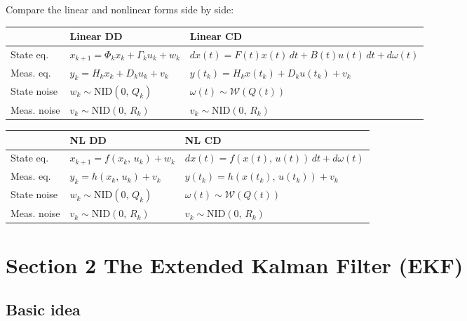 \documentclass[12pt, a4paper]{article}
\begin{document}
Compare the linear and nonlinear forms side by side:
\begin{center}
\renewcommand{\arraystretch}{1.5}
\begin{tabular}{p{2cm} p{5.8cm} p{5.8cm}}
  \toprule
  & \textbf{Linear DD} & \textbf{Linear CD} \\
  \midrule
  State eq. &
    $x_{k+1} = \Phi_k x_k + \Gamma_k u_k + w_k$ &
    $dx(t) = F(t)x(t)\,dt + B(t)u(t)\,dt + d\omega(t)$ \\
  Meas. eq. &
    $y_k = H_k x_k + D_k u_k + v_k$ &
    $y(t_k) = H_k x(t_k) + D_k u(t_k) + v_k$ \\
  State noise &
    $w_k \sim \mathrm{NID}(0,\,Q_k)$ &
    $\omega(t) \sim \mathcal{W}(Q(t))$ \\
  Meas. noise &
    $v_k \sim \mathrm{NID}(0,\,R_k)$ &
    $v_k \sim \mathrm{NID}(0,\,R_k)$ \\
  \bottomrule
\end{tabular}
\end{center}

\begin{center}
\renewcommand{\arraystretch}{1.5}
\begin{tabular}{p{2cm} p{5.8cm} p{5.8cm}}
  \toprule
  & \textbf{NL DD} & \textbf{NL CD} \\
  \midrule
  State eq. &
    $x_{k+1} = f(x_k,\, u_k) + w_k$ &
    $dx(t) = f(x(t),\, u(t))\,dt + d\omega(t)$ \\
  Meas. eq. &
    $y_k = h(x_k,\, u_k) + v_k$ &
    $y(t_k) = h(x(t_k),\, u(t_k)) + v_k$ \\
  State noise &
    $w_k \sim \mathrm{NID}(0,\,Q_k)$ &
    $\omega(t) \sim \mathcal{W}(Q(t))$ \\
  Meas. noise &
    $v_k \sim \mathrm{NID}(0,\,R_k)$ &
    $v_k \sim \mathrm{NID}(0,\,R_k)$ \\
  \bottomrule
\end{tabular}
\end{center}

\section*{Section 2 \quad The Extended Kalman Filter (EKF)}

\subsection*{Basic idea}
\end{document}
